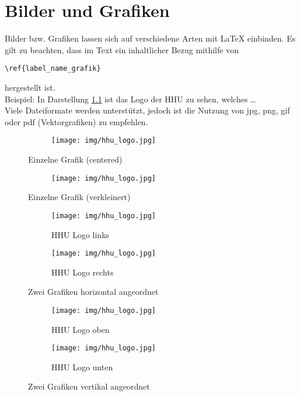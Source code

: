 \chapter{Bilder und Grafiken}

Bilder bzw. Grafiken lassen sich auf verschiedene Arten mit LaTeX einbinden. 
Es gilt zu beachten, dass im Text ein inhaltlicher Bezug mithilfe von \begin{verbatim}\ref{label_name_grafik}\end{verbatim}
hergestellt ist.\\
Beispiel: In Darstellung \ref{grafik_1} ist das Logo der HHU zu sehen, welches \ldots\\
Viele Dateiformate werden unterstützt, jedoch ist die Nutzung von jpg, png, gif oder pdf (Vektorgrafiken) zu empfehlen.

\begin{figure}
  \centering
  \begin{subfigure}[b]{1.0\textwidth}
    \texttt{[image: img/hhu\_logo.jpg]}
  \end{subfigure}
  \caption{Einzelne Grafik (centered)}
  \label{grafik_1}
\end{figure}

\begin{figure}
  \centering
  \begin{subfigure}[b]{0.5\textwidth}
    \texttt{[image: img/hhu\_logo.jpg]}
  \end{subfigure}
  \caption{Einzelne Grafik (verkleinert)}
  \label{grafik_2}
\end{figure}

\begin{figure}
  \centering
  \begin{subfigure}[b]{0.45\textwidth}
    \texttt{[image: img/hhu\_logo.jpg]}
    \caption{HHU Logo links}
    \label{grafik_3}
  \end{subfigure}
  \begin{subfigure}[b]{0.45\textwidth}
    \texttt{[image: img/hhu\_logo.jpg]}
    \caption{HHU Logo rechts}
    \label{grafik_4}
  \end{subfigure}
  \caption{Zwei Grafiken horizontal angeordnet}
  \label{zwei_grafiken}
\end{figure}

\begin{figure}
  \centering
  \begin{subfigure}[b]{0.8\textwidth}
    \texttt{[image: img/hhu\_logo.jpg]}
    \caption{HHU Logo oben}
    \label{grafik_5}
  \end{subfigure}
  \begin{subfigure}[b]{0.8\textwidth}
    \texttt{[image: img/hhu\_logo.jpg]}
    \caption{HHU Logo unten}
    \label{grafik_6}
  \end{subfigure}
  \caption{Zwei Grafiken vertikal angeordnet}
  \label{zwei_grafiken_2}
\end{figure}
